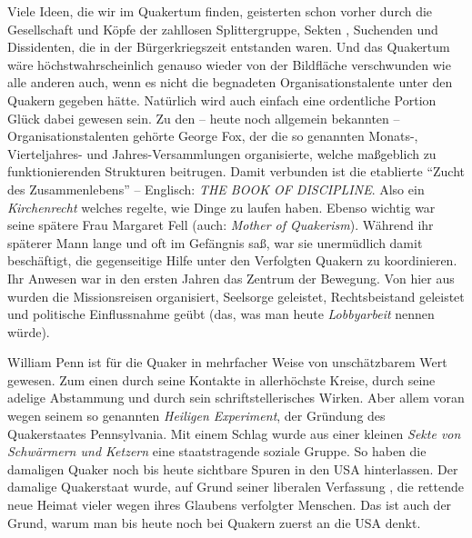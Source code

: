 Viele Ideen, die wir im Quakertum finden, geisterten schon vorher durch die
Gesellschaft und Köpfe der zahllosen Splittergruppe, Sekten
, Suchenden und
Dissidenten, die in der Bürgerkriegszeit
 entstanden waren. Und das Quakertum
wäre höchstwahrscheinlich genauso wieder von der Bildfläche verschwunden wie
alle anderen auch, wenn es nicht die begnadeten Organisationstalente unter den
Quakern gegeben hätte. Natürlich wird auch einfach eine ordentliche Portion
Glück
dabei gewesen sein. Zu den -- heute noch allgemein bekannten --
Organisationstalenten gehörte George Fox, der die so genannten Monats-,
Vierteljahres-
und Jahres-Versammlungen
 organisierte, welche maßgeblich zu
funktionierenden
Strukturen beitrugen. Damit verbunden ist die etablierte "`Zucht des
Zusammenlebens"'
--
Englisch: \textit{THE BOOK OF DISCIPLINE}. Also ein
\textit{Kirchenrecht} welches
regelte, wie Dinge zu laufen haben. Ebenso wichtig war seine spätere Frau
Margaret Fell (auch: \textit{Mother of
Quakerism}). Während ihr späterer Mann
lange und oft im Gefängnis saß, war sie unermüdlich damit beschäftigt, die
gegenseitige Hilfe unter den Verfolgten Quakern zu
koordinieren. Ihr Anwesen
war in den ersten Jahren das Zentrum der Bewegung. Von hier aus wurden die
Missionsreisen organisiert, Seelsorge geleistet,
Rechtsbeistand geleistet und
politische Einflussnahme geübt (das, was man heute
\textit{Lobbyarbeit} nennen
würde).

\medskip

William Penn ist für die Quaker in mehrfacher Weise von unschätzbarem Wert
gewesen.
Zum einen durch seine Kontakte in allerhöchste Kreise, durch seine adelige
Abstammung
und
durch sein schriftstellerisches Wirken. Aber allem voran wegen seinem so
genannten \textit{Heiligen Experiment}, der
Gründung des Quakerstaates
Pennsylvania. Mit einem Schlag wurde aus einer kleinen \textit{Sekte von
Schwärmern und Ketzern} eine staatstragende soziale Gruppe. So haben die
damaligen Quaker noch bis heute sichtbare Spuren in den USA
hinterlassen.
Der damalige Quakerstaat wurde, auf Grund seiner liberalen Verfassung
, die
rettende neue Heimat vieler wegen ihres Glaubens verfolgter Menschen. Das ist
auch der Grund, warum man bis heute noch bei Quakern zuerst an die USA denkt.

